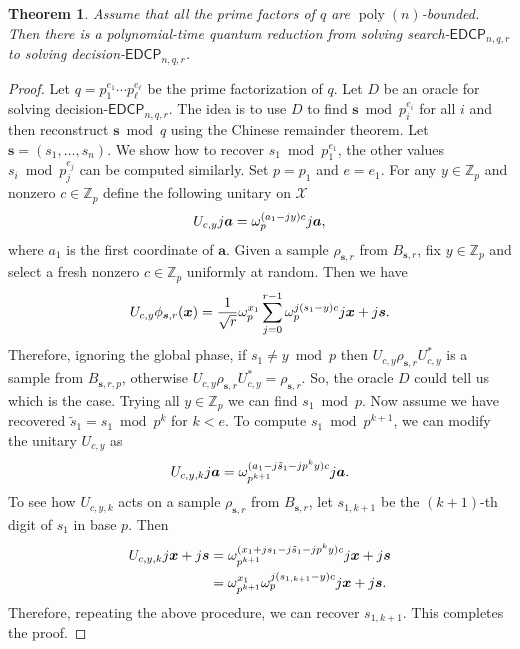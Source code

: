 \documentclass[11pt]{article}
\theoremstyle{plain}
\newtheorem{theorem}{Theorem}
\theoremstyle{definition}
\DeclareMathOperator{\poly}{poly}
\let\ket\relax
\DeclarePairedDelimiter{\ket}{\lvert}{\rangle}
\def\Z{\mathbb{Z}}
\def\edcp{\mathsf{EDCP}}
\def\X{\mathcal{X}}
\begin{document}
\begin{theorem}
    Assume that all the prime factors of $q$ are $\poly(n)$-bounded. Then there is a polynomial-time quantum reduction from solving search-$\edcp_{n, q, r}$ to solving decision-$\edcp_{n, q, r}$.
\end{theorem}
\begin{proof}
    Let $q = p_1^{e_1} \cdots p_\ell^{e_\ell}$ be the prime factorization of $q$. Let $D$ be an oracle for solving decision-$\edcp_{n, q, r}$. The idea is to use $D$ to find $\bm{s} \bmod p_i^{e_i}$ for all $i$ and then reconstruct $\bm{s} \bmod q$ using the Chinese remainder theorem. Let $\bm{s} = (s_1, \dots, s_n)$. We show how to recover $s_1 \bmod p_1^{e_1}$, the other values $s_i \bmod p_j^{e_j}$ can be computed similarly. Set $p = p_1$ and $e = e_1$.
    For any $y \in \Z_p$ and nonzero $c \in \Z_p$ define the following unitary on $\X$
    \[ U_{c, y} \ket{j}\ket{\bm{a}} = \omega_p^{(a_1 - jy)c}\ket{j}\ket{\bm{a}}, \]
    where $a_1$ is the first coordinate of $\bm{a}$. Given a sample $\rho_{\bm{s}, r}$ from $B_{\bm{s}, r}$, fix $y \in \Z_p$ and select a fresh nonzero $c \in \Z_p$ uniformly at random. Then we have
    \[ U_{c, y}\ket{\phi_{\bm{s}, r}(\bm{x})} = \frac{1}{\sqrt{r}} \omega_p^{x_1}\sum_{j = 0}^{r - 1} \omega_p^{j(s_1 - y)c} \ket{j}\ket{\bm{x} + j\bm{s}}. \]
    Therefore, ignoring the global phase, if $s_1 \ne y \bmod p$ then $U_{c, y} \rho_{\bm{s}, r} U_{c, y}^*$ is a sample from $B_{\bm{s}, r, p}$, otherwise $U_{c, y} \rho_{\bm{s}, r} U_{c, y}^* = \rho_{\bm{s}, r}$. So, the oracle $D$ could tell us which is the case. Trying all $y \in \Z_p$ we can find $s_1 \bmod p$. Now assume we have recovered $\tilde{s}_1 = s_1 \bmod p^k$ for $k < e$. To compute $s_1 \bmod p^{k + 1}$, we can modify the unitary $U_{c, y}$ as 
    \[ U_{c, y, k} \ket{j}\ket{\bm{a}} = \omega_{p^{k + 1}}^{(a_1 - j\tilde{s}_1 - jp^ky)c}\ket{j}\ket{\bm{a}}. \]
    To see how $U_{c, y, k}$ acts on a sample $\rho_{\bm{s}, r}$ from $B_{\bm{s}, r}$, let $s_{1, k + 1}$ be the $(k + 1)$-th digit of $s_1$ in base $p$. Then
    \begin{align*}
        U_{c, y, k} \ket{j}\ket{\bm{x} + j\bm{s}}
        & = \omega_{p^{k + 1}}^{(x_1 + js_1 - j\tilde{s}_1 - jp^ky)c}\ket{j}\ket{\bm{x} + j\bm{s}} \\
        & = \omega_{p^{k + 1}}^{x_1} \omega_p^{j(s_{1, k + 1} - y)c}\ket{j}\ket{\bm{x} + j\bm{s}}.
    \end{align*}
    Therefore, repeating the above procedure, we can recover $s_{1, k + 1}$. This completes the proof.
\end{proof}
\end{document}
